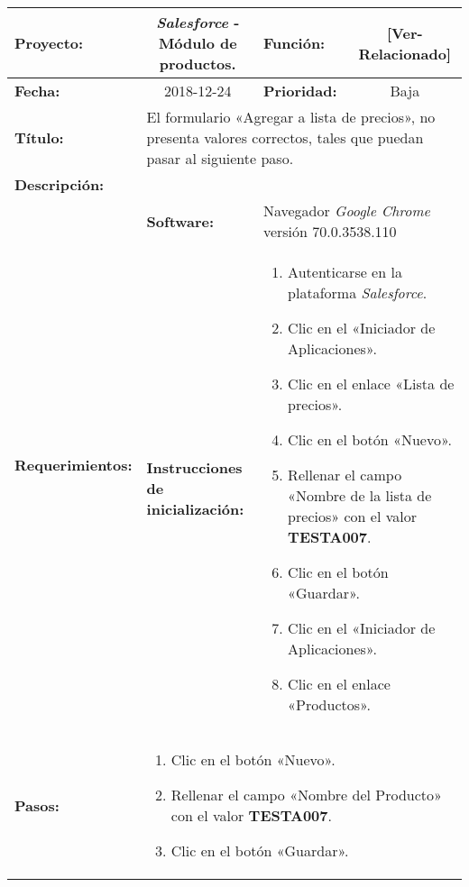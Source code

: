 \begin{table}[H]
\centering
\begin{tabular}{|p{2.5cm}|p{2.8cm}|p{2.2cm}|p{2.8cm}|p{2.2cm}|}
\hline
\footnotesize{\textbf{Proyecto:}} &
\multicolumn{2}{c|}{\footnotesize{\emph{Salesforce} - Módulo de productos.}} &
\footnotesize{\textbf{Función:}} &
\multicolumn{1}{c|}{\footnotesize{[Ver-Relacionado]}} \\
\hline
\footnotesize{\textbf{Fecha:}} & \multicolumn{2}{c|}{\footnotesize{2018-12-24}} &
\footnotesize{\textbf{Prioridad:}} &
\multicolumn{1}{c|}{\footnotesize{Baja}} \\
\hline
\footnotesize{\textbf{Título:}} &
\multicolumn{4}{p{12.4cm}|}{\footnotesize{El formulario «Agregar a lista de
precios», no presenta valores correctos, tales que puedan pasar al siguiente
paso.}} \\
\hline
\footnotesize{\textbf{Descripción:}} &
\multicolumn{4}{p{12.4cm}|}{\footnotesize{}} \\
\hline
\multirow{2}{*}{\footnotesize{\textbf{Requerimientos:}}} &
\footnotesize{\textbf{Software:}} &
\multicolumn{3}{p{7.8cm}|}{\footnotesize{Navegador \emph{Google Chrome}
versión 70.0.3538.110}} \\
\cline{2-5}
& \footnotesize{\textbf{Instrucciones de inicialización:}} &
\multicolumn{3}{p{7.8cm}|}{\footnotesize{
\begin{enumerate}
\item Autenticarse en la plataforma \emph{Salesforce}.
\item Clic en el «Iniciador de Aplicaciones».
\item Clic en el enlace «Lista de precios».
\item Clic en el botón «Nuevo».
\item Rellenar el campo «Nombre de la lista de precios» con el valor
    \textbf{TESTA007}.
\item Clic en el botón «Guardar».
\item Clic en el «Iniciador de Aplicaciones».
\item Clic en el enlace «Productos».
\end{enumerate}
}} \\
\hline
\footnotesize{\textbf{Pasos:}} &
\multicolumn{4}{p{11.8cm}|}{\footnotesize{
\begin{enumerate}
\item Clic en el botón «Nuevo».
\item Rellenar el campo «Nombre del Producto» con el valor \textbf{TESTA007}.
\item Clic en el botón «Guardar».

\end{enumerate}}}
\end{tabular}
\end{table}
